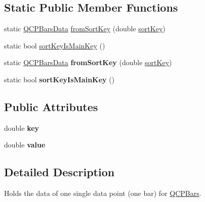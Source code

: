 \subsection*{Static Public Member Functions}
\begin{DoxyCompactItemize}
\item 
static \hyperlink{class_q_c_p_bars_data}{Q\+C\+P\+Bars\+Data} \hyperlink{class_q_c_p_bars_data_ad170d4e90498005ec319338910252ba8}{from\+Sort\+Key} (double \hyperlink{class_q_c_p_bars_data_aec71a3f55d0d52192ff9ad85b04ebf8d}{sort\+Key})
\item 
static bool \hyperlink{class_q_c_p_bars_data_aebaabda335bd4c9f81bd585d16b63aa8}{sort\+Key\+Is\+Main\+Key} ()
\item 
static \hyperlink{class_q_c_p_bars_data}{Q\+C\+P\+Bars\+Data} {\bfseries from\+Sort\+Key} (double \hyperlink{class_q_c_p_bars_data_aec71a3f55d0d52192ff9ad85b04ebf8d}{sort\+Key})\hypertarget{class_q_c_p_bars_data_ad170d4e90498005ec319338910252ba8}{}\label{class_q_c_p_bars_data_ad170d4e90498005ec319338910252ba8}

\item 
static bool {\bfseries sort\+Key\+Is\+Main\+Key} ()\hypertarget{class_q_c_p_bars_data_a2d24f70f768f0a41defa85f84868039d}{}\label{class_q_c_p_bars_data_a2d24f70f768f0a41defa85f84868039d}

\end{DoxyCompactItemize}
\subsection*{Public Attributes}
\begin{DoxyCompactItemize}
\item 
double {\bfseries key}\hypertarget{class_q_c_p_bars_data_a09b492217dc03ee1c0348a2f2e6e0a04}{}\label{class_q_c_p_bars_data_a09b492217dc03ee1c0348a2f2e6e0a04}

\item 
double {\bfseries value}\hypertarget{class_q_c_p_bars_data_ab636644fb40630f3b1b72f44d65ec072}{}\label{class_q_c_p_bars_data_ab636644fb40630f3b1b72f44d65ec072}

\end{DoxyCompactItemize}


\subsection{Detailed Description}
Holds the data of one single data point (one bar) for \hyperlink{class_q_c_p_bars}{Q\+C\+P\+Bars}. 

